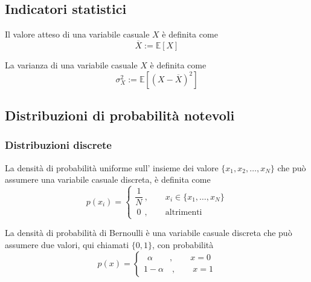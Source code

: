 \subsection{Indicatori statistici}
\begin{definition}
    Il valore atteso di una variabile casuale $X$ è definita come
    \begin{equation}
        \overline{X} := \mathbb{E}[X]
    \end{equation}
\end{definition}
\begin{definition}[Varianza]
    La varianza di una variabile casuale $X$ è definita come
    \begin{equation}
        \sigma_{X}^2 := \mathbb{E}\left[(X-\overline{X})^2\right]
    \end{equation}
\end{definition}
\subsection{Distribuzioni di probabilità notevoli}
\subsubsection{Distribuzioni discrete}
\begin{definition} La densità di probabilità uniforme sull' insieme dei valore $\{x_1, x_2, \dots, x_N \}$ che può assumere una variabile casuale discreta, è definita come
    \begin{equation}
        p(x_i) = \begin{cases}
            \dfrac{1}{N} \ , \qquad x_i \in \{x_1, \dots, x_N\} \\
            \ 0        \ \ , \qquad \text{altrimenti}
        \end{cases}
    \end{equation}
\end{definition}
\begin{definition} La densità di probabilità di Bernoulli è una variabile casuale discreta che può assumere due valori, qui chiamati $\{0, 1\}$, con probabilità
    \begin{equation}
        p(x) = \begin{cases}
            \ \ \alpha \qquad , \qquad x = 0 \\
            1- \alpha   \quad , \qquad x = 1
        \end{cases}
    \end{equation}
\end{definition}
\begin{definition}
\end{definition}
\begin{definition}
\end{definition}

